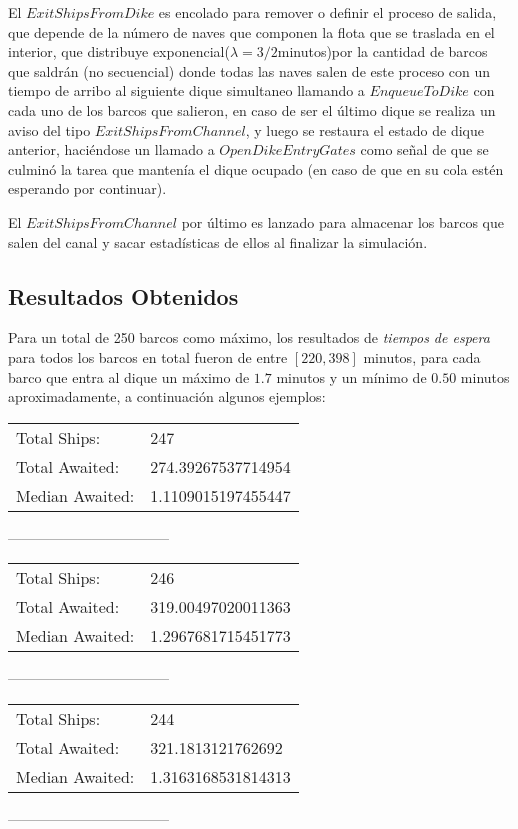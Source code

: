 \documentclass[a4paper,10pt,twocolumn]{article}
\begin{document}
  El $ExitShipsFromDike$ es encolado para remover o definir el proceso de salida, que depende de la n\'umero de naves que componen la flota que se traslada en el interior, que distribuye exponencial($\lambda=3/2$minutos)por la cantidad de barcos que saldr\'an (no secuencial) donde todas las naves salen de este proceso con un tiempo de arribo al siguiente dique simultaneo llamando a $EnqueueToDike$ con cada uno de los barcos que salieron, en caso de ser el \'ultimo dique se realiza un aviso del tipo $ExitShipsFromChannel$, y luego se restaura el estado de dique anterior, haci\'endose un llamado a $OpenDikeEntryGates$ como señal de que se culmin\'o la tarea que manten\'ia el dique ocupado (en caso de que en su cola est\'en esperando por continuar).
  
  El $ExitShipsFromChannel$ por \'ultimo es lanzado para almacenar los barcos que salen del canal y sacar estad\'isticas de ellos al finalizar la simulaci\'on.
	
\subsection{Resultados Obtenidos}
	Para un total de 250 barcos como m\'aximo, los resultados de \textit{tiempos de espera} para todos los barcos en total fueron de entre $[220, 398]$ minutos, para cada barco que entra al dique un m\'aximo de $1.7$ minutos y un m\'inimo de $0.50$ minutos aproximadamente, a continuaci\'on algunos ejemplos:
	\\
	
	\begin{tabular}{ll}
		Total    Ships: &247\\
		Total  Awaited: &274.39267537714954\\
		Median Awaited: &1.1109015197455447\\
	\end{tabular}

		-----------------------------------\\

	\begin{tabular}{ll}
		Total    Ships: &246\\
		Total  Awaited: &319.00497020011363\\
		Median Awaited: &1.2967681715451773\\
	\end{tabular}

		-----------------------------------\\
		
	\begin{tabular}{ll}
		Total    Ships: &244\\
		Total  Awaited: &321.1813121762692\\
		Median Awaited: &1.3163168531814313\\
	\end{tabular}

		-----------------------------------\\
	
		
\end{document}
